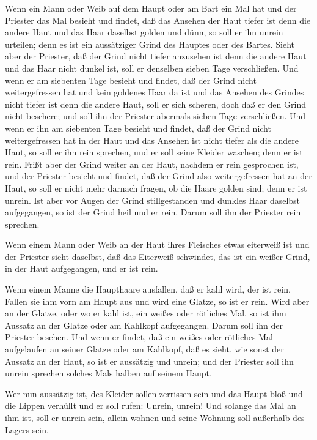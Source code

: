  Wenn ein Mann oder Weib auf dem Haupt oder am Bart ein Mal
hat  und der Priester das Mal besieht und findet, daß das
Ansehen der Haut tiefer ist denn die andere Haut und das Haar daselbst
golden und dünn, so soll er ihn unrein urteilen; denn es ist ein
aussätziger Grind des Hauptes oder des Bartes.  Sieht aber
der Priester, daß der Grind nicht tiefer anzusehen ist denn die andere
Haut und das Haar nicht dunkel ist, soll er denselben sieben Tage
verschließen.  Und wenn er am siebenten Tage besieht und
findet, daß der Grind nicht weitergefressen hat und kein goldenes Haar
da ist und das Ansehen des Grindes nicht tiefer ist denn die andere
Haut,  soll er sich scheren, doch daß er den Grind nicht
beschere; und soll ihn der Priester abermals sieben Tage verschließen.
 Und wenn er ihn am siebenten Tage besieht und findet, daß
der Grind nicht weitergefressen hat in der Haut und das Ansehen ist
nicht tiefer als die andere Haut, so soll er ihn rein sprechen, und er
soll seine Kleider waschen; denn er ist rein.  Frißt aber
der Grind weiter an der Haut, nachdem er rein gesprochen ist,
 und der Priester besieht und findet, daß der Grind also
weitergefressen hat an der Haut, so soll er nicht mehr darnach fragen,
ob die Haare golden sind; denn er ist unrein.  Ist aber vor
Augen der Grind stillgestanden und dunkles Haar daselbst aufgegangen, so
ist der Grind heil und er rein. Darum soll ihn der Priester rein
sprechen.

 Wenn einem Mann oder Weib an der Haut ihres Fleisches
etwas eiterweiß ist  und der Priester sieht daselbst, daß
das Eiterweiß schwindet, das ist ein weißer Grind, in der Haut
aufgegangen, und er ist rein.

 Wenn einem Manne die Haupthaare ausfallen, daß er kahl
wird, der ist rein.  Fallen sie ihm vorn am Haupt aus und
wird eine Glatze, so ist er rein.  Wird aber an der Glatze,
oder wo er kahl ist, ein weißes oder rötliches Mal, so ist ihm Aussatz
an der Glatze oder am Kahlkopf aufgegangen.  Darum soll ihn
der Priester besehen. Und wenn er findet, daß ein weißes oder rötliches
Mal aufgelaufen an seiner Glatze oder am Kahlkopf, daß es sieht, wie
sonst der Aussatz an der Haut,  so ist er aussätzig und
unrein; und der Priester soll ihn unrein sprechen solches Mals halben
auf seinem Haupt.

 Wer nun aussätzig ist, des Kleider sollen zerrissen sein
und das Haupt bloß und die Lippen verhüllt und er soll rufen: Unrein,
unrein!  Und solange das Mal an ihm ist, soll er unrein
sein, allein wohnen und seine Wohnung soll außerhalb des Lagers sein.

